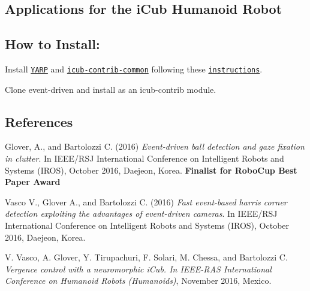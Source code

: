 \subsection*{Applications for the i\+Cub Humanoid Robot}

\subsection*{How to Install\+:}


\begin{DoxyEnumerate}
\item Install \href{https://github.com/robotology/yarp}{\tt Y\+A\+RP} and \href{https://github.com/robotology/icub-contrib-common}{\tt icub-\/contrib-\/common} following these \href{http://wiki.icub.org/wiki/Linux:Installation_from_sources}{\tt instructions}.
\item Clone event-\/driven and install as an icub-\/contrib module.
\end{DoxyEnumerate}

\subsection*{References}

Glover, A., and Bartolozzi C. (2016) {\itshape Event-\/driven ball detection and gaze fixation in clutter}. In I\+E\+E\+E/\+R\+SJ International Conference on Intelligent Robots and Systems (I\+R\+OS), October 2016, Daejeon, Korea. {\bfseries Finalist for Robo\+Cup Best Paper Award}

Vasco V., Glover A., and Bartolozzi C. (2016) {\itshape Fast event-\/based harris corner detection exploiting the advantages of event-\/driven cameras}. In I\+E\+E\+E/\+R\+SJ International Conference on Intelligent Robots and Systems (I\+R\+OS), October 2016, Daejeon, Korea.

V. Vasco, A. Glover, Y. Tirupachuri, F. Solari, M. Chessa, and Bartolozzi C. {\itshape Vergence control with a neuromorphic i\+Cub. In I\+E\+E\+E-\/\+R\+AS International Conference on Humanoid Robots (Humanoids)}, November 2016, Mexico. 